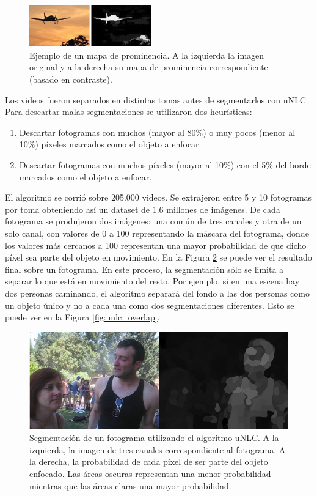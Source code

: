 \documentclass[spanish]{report}
\begin{document}
\begin{figure}[H]
\centering
 \includegraphics[width=200px]{silency_map.png}
   \caption{Ejemplo de un mapa de prominencia. A la izquierda la imagen original y a la derecha su mapa de prominencia correspondiente (basado en contraste).\protect\footnotemark}
  \label{fig:silency_map}
\end{figure}

Los videos fueron separados en distintas tomas antes de segmentarlos con uNLC. Para descartar malas segmentaciones se utilizaron dos heurísticas:

\begin{enumerate}
\item Descartar fotogramas con muchos (mayor al 80\%) o muy pocos (menor al 10\%) píxeles marcados como el objeto a enfocar.
\item Descartar fotogramas con muchos píxeles (mayor al 10\%) con el 5\% del borde marcados como el objeto a enfocar.
\end{enumerate}

El algoritmo se corrió sobre 205.000 videos. Se extrajeron entre 5 y 10 fotogramas por toma obteniendo así un dataset de 1.6 millones de imágenes. De cada fotograma se produjeron dos imágenes: una común de tres canales y otra de un solo canal, con valores de 0 a 100 representando la máscara del fotograma, donde los valores más cercanos a 100 representan una mayor probabilidad de que dicho píxel sea parte del objeto en movimiento. En la Figura \ref{fig:ejemplo_unlc} se puede ver el resultado final sobre un fotograma. En este proceso, la segmentación sólo se limita a separar lo que está en movimiento del resto. Por ejemplo, si en una escena hay dos personas caminando, el algoritmo separará del fondo a las dos personas como un objeto único y no a cada una como dos segmentaciones diferentes. Esto se puede ver en la Figura \ref{fig:unlc_overlap}. 

\begin{figure}[H]
\centering
 \includegraphics[width=\linewidth]{ejemplo_unlc.jpg}
   \caption{Segmentación de un fotograma utilizando el algoritmo uNLC. A la izquierda, la imagen de tres canales correspondiente al fotograma. A la derecha, la probabilidad de cada píxel de ser parte del objeto enfocado. Las áreas oscuras representan una menor probabilidad mientras que las áreas claras una mayor probabilidad.}
  \label{fig:ejemplo_unlc}
\end{figure}
\end{document}
